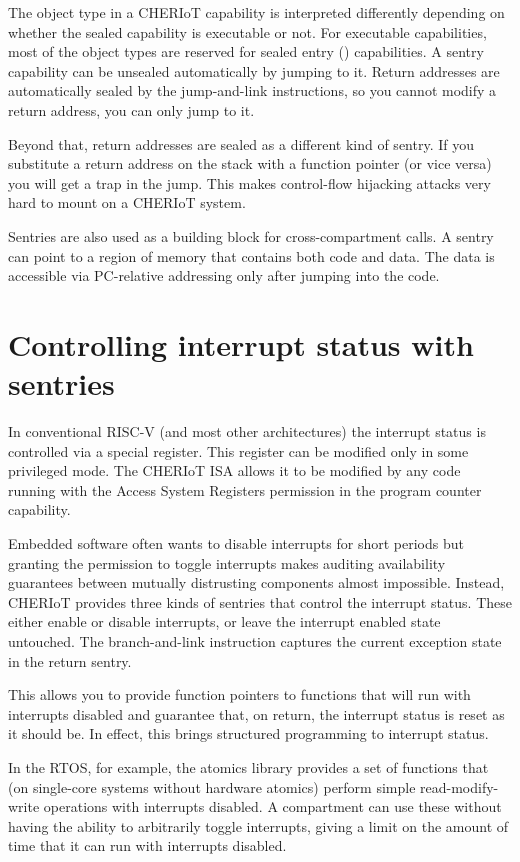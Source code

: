The object type in a CHERIoT capability is interpreted differently depending on whether the sealed capability is executable or not.
For executable capabilities, most of the object types are reserved for sealed entry () capabilities.
A sentry capability can be unsealed automatically by jumping to it.
Return addresses are automatically sealed by the jump-and-link instructions, so you cannot modify a return address, you can only jump to it.

Beyond that, return addresses are sealed as a different kind of sentry.
If you substitute a return address on the stack with a function pointer (or vice versa) you will get a trap in the jump.
This makes control-flow hijacking attacks very hard to mount on a CHERIoT system.

Sentries are also used as a building block for cross-compartment calls.
A sentry can point to a region of memory that contains both code and data.
The data is accessible via PC-relative addressing only after jumping into the code.

\section[label=interrupt_sentries]{Controlling interrupt status with sentries}

In conventional RISC-V (and most other architectures) the interrupt status is controlled via a special register.
This register can be modified only in some privileged mode.
The CHERIoT ISA allows it to be modified by any code running with the Access System Registers permission in the program counter capability.

Embedded software often wants to disable interrupts for short periods but granting the permission to toggle interrupts makes auditing availability guarantees between mutually distrusting components almost impossible.
Instead, CHERIoT provides three kinds of sentries that control the interrupt status.
These either enable or disable interrupts, or leave the interrupt enabled state untouched.
The branch-and-link instruction captures the current exception state in the return sentry.

This allows you to provide function pointers to functions that will run with interrupts disabled and guarantee that, on return, the interrupt status is reset as it should be.
In effect, this brings structured programming to interrupt status.

In the RTOS, for example, the atomics library provides a set of functions that (on single-core systems without hardware atomics) perform simple read-modify-write operations with interrupts disabled.
A compartment can use these without having the ability to arbitrarily toggle interrupts, giving a limit on the amount of time that it can run with interrupts disabled.

